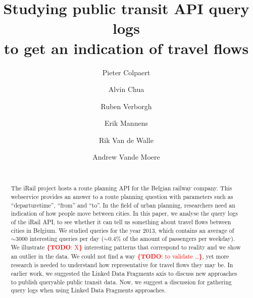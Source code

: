 \documentclass{sig-alternate}
\newcommand{\todo}[1]{\noindent\textcolor{red}{{\bf \{TODO}: #1{\bf \}}}}
\begin{document}
\title{Studying public transit API query logs\\ to get an indication of travel flows}
\author{
\alignauthor
Pieter Colpaert\\
\and
\alignauthor
Alvin Chua\\
\and
\alignauthor
Ruben Verborgh\\
\and
\alignauthor
Erik Mannens\\
\and
\alignauthor
Rik Van de Walle\\
\and
\alignauthor
Andrew Vande Moere\\
\\
}

\maketitle
\begin{abstract}
The iRail project hosts a route planning API for the Belgian railway company.
This webservice provides an answer to a route planning question with parameters such as ``departuretime'', ``from'' and ``to''.
In the field of urban planning, researchers need an indication of how people move between cities. 
In this paper, we analyse the query logs of the iRail API, to see whether it can tell us something about travel flows between cities in Belgium.
We studied queries for the year 2013, which contains an average of $\sim3000$ interesting queries per day ($\sim0.4\%$ of the amount of passengers per weekday).
We illustrate \todo{X} interesting patterns that correspond to reality and we show an outlier in the data.
We could not find a way \todo{to validate \ldots}, yet more research is needed to understand how representative for travel flows they may be.
In earlier work, we suggested the Linked Data Fragments axis to discuss new approaches to publish queryable public transit data.
Now, we suggest a discussion for gathering query logs when using Linked Data Fragments approaches.

\end{abstract}
\end{document}
